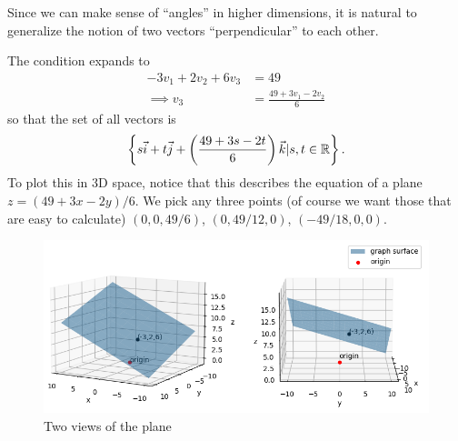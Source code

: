 Since we can make sense of ``angles'' in higher dimensions, it is natural to generalize the notion of two vectors ``perpendicular'' to each other.

\label{plane_projection}
The condition expands to \begin{align*}
	-3v_1+2v_2+6v_3 &= 49 \\
	\implies v_3 &= \frac{49+3v_1 - 2v_2}{6}  
\end{align*}
so that the set of all vectors is \[
	\left\{s \vec{i}+t \vec{j}+\left(\frac{49+3s - 2t}{6}\right) \vec{k} | s,t\in\mathbb{R}\right\}.
\]
To plot this in 3D space, notice that this describes the equation of a plane $z={(49+3x-2y)}/{6}$. We pick any three points (of course we want those that are easy to calculate) $(0,0,49/6)$, $(0,49/12,0)$, $(-49/18,0,0)$.

\begin{figure}
	\centering
	\includegraphics[width=\textwidth]{coordinate_geometry/plane2.png}
	\caption{Two views of the plane}
\end{figure}\ \\


